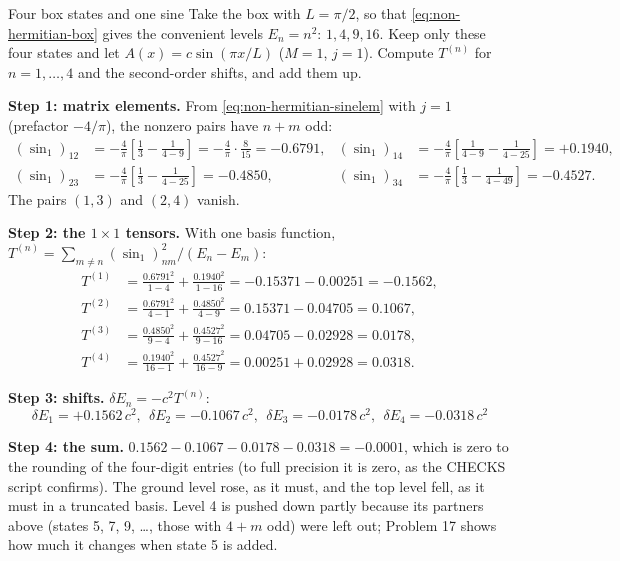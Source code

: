 \begin{sample}{Four box states and one sine}
Take the box with $L=\pi/2$, so that \eqref{eq:non-hermitian-box} gives the convenient levels $E_n=n^2$: $1,4,9,16$. Keep only these four states and let $A(x)=c\sin(\pi x/L)$ ($M=1$, $j=1$). Compute $T^{(n)}$ for $n=1,\dots,4$ and the second-order shifts, and add them up.

\textbf{Step 1: matrix elements.} From \eqref{eq:non-hermitian-sinelem} with $j=1$ (prefactor $-4/\pi$), the nonzero pairs have $n+m$ odd:
\begin{align*}
(\sin_1)_{12} &= -\tfrac{4}{\pi}\left[\tfrac13 - \tfrac{1}{4-9}\right] = -\tfrac4\pi\cdot\tfrac{8}{15} = -0.6791,&
(\sin_1)_{14} &= -\tfrac{4}{\pi}\left[\tfrac{1}{4-9} - \tfrac{1}{4-25}\right] = +0.1940,\\
(\sin_1)_{23} &= -\tfrac{4}{\pi}\left[\tfrac13 - \tfrac{1}{4-25}\right] = -0.4850,&
(\sin_1)_{34} &= -\tfrac{4}{\pi}\left[\tfrac13 - \tfrac{1}{4-49}\right] = -0.4527 .
\end{align*}
The pairs $(1,3)$ and $(2,4)$ vanish.

\textbf{Step 2: the $1\times1$ tensors.} With one basis function, $T^{(n)}=\sum_{m\ne n}(\sin_1)_{nm}^2/(E_n-E_m)$:
\begin{align*}
T^{(1)} &= \tfrac{0.6791^2}{1-4}+\tfrac{0.1940^2}{1-16} = -0.15371-0.00251 = -0.1562,\\
T^{(2)} &= \tfrac{0.6791^2}{4-1}+\tfrac{0.4850^2}{4-9} = 0.15371-0.04705 = 0.1067,\\
T^{(3)} &= \tfrac{0.4850^2}{9-4}+\tfrac{0.4527^2}{9-16} = 0.04705-0.02928 = 0.0178,\\
T^{(4)} &= \tfrac{0.1940^2}{16-1}+\tfrac{0.4527^2}{16-9} = 0.00251+0.02928 = 0.0318.
\end{align*}

\textbf{Step 3: shifts.} $\delta E_n=-c^2T^{(n)}$:
\[
\boxed{\delta E_1 = +0.1562\,c^2,\ \ \delta E_2 = -0.1067\,c^2,\ \ \delta E_3=-0.0178\,c^2,\ \ \delta E_4=-0.0318\,c^2}
\]

\textbf{Step 4: the sum.} $0.1562-0.1067-0.0178-0.0318 = -0.0001$, which is zero to the rounding of the four-digit entries (to full precision it is zero, as the CHECKS script confirms). The ground level rose, as it must, and the top level fell, as it must in a truncated basis. Level 4 is pushed down partly because its partners above (states 5, 7, 9, \dots, those with $4+m$ odd) were left out; Problem 17 shows how much it changes when state 5 is added.
\end{sample}

